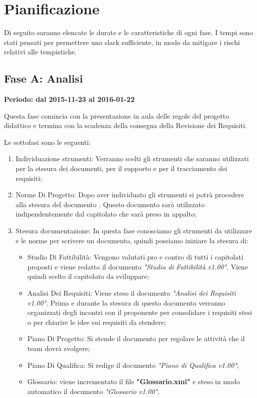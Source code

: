 \documentclass[../PianoProgetto.tex]{subfiles}
\begin{document}
\section{Pianificazione}

	Di seguito saranno elencate le durate e le caratteristiche di ogni fase. I tempi sono stati pensati per permettere uno slack sufficiente, in modo da mitigare i rischi relativi alle tempistiche.
	
	\subsection{Fase A: Analisi}
	
	\textbf{Periodo: dal 2015-11-23 al 2016-01-22}

	Questa fase comincia con la presentazione in aula delle regole del progetto didattico e termina con la scadenza della consegna della Revisione dei Requisiti.

	Le sottofasi sono le seguenti:
	\begin{enumerate}
		\item Individuazione strumenti: Verranno scelti gli strumenti che saranno utilizzati per la stesura dei documenti, per il supporto e per il tracciamento dei requisiti;
		\item Norme Di Progetto: Dopo aver individuato gli strumenti si potrà procedere alla stesura del documento \normediprogettov . Questo documento sarà utilizzato indipendentemente dal capitolato che sarà preso in appalto;
		\item Stesura documentazione: In questa fase conosciamo gli strumenti da utilizzare e le norme per scrivere un documento, quindi possiamo iniziare la stesura di:
		\begin{itemize}
		\item Studio Di Fattibilità: Vengono valutati pro e contro di tutti i capitolati proposti e viene redatto il documento \textit{"Studio di Fattibilità v1.00"}. Viene quindi scelto il capitolato da sviluppare;
		\item Analisi Dei Requisiti: Viene steso il documento \textit{"Analisi dei Requisiti v1.00"}. Prima e durante la stesura di questo documento verranno organizzati degli incontri con il proponente per consolidare i requisiti stesi o per chiarire le idee sui requisiti da stendere;
		\item Piano Di Progetto: Si stende il documento \pianodiprogettov per regolare le attività che il team dovrà svolgere;
		\item Piano Di Qualifica: Si redige il documento \textit{"Piano di Qualifica v1.00"};
		\item Glossario: viene incrementato il file \textbf{"Glossario.xml"} e steso in modo automatico il documento \textit{"Glossario v1.00"}.
		\end{itemize}
	\end{enumerate}
		
\end{document}
